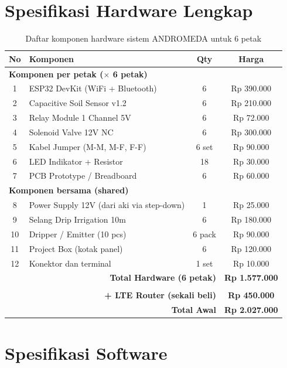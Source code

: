 \documentclass[12pt,a4paper,oneside]{report}
\begin{document}
\section{Spesifikasi Hardware Lengkap}

\begin{table}[H]
\centering
\caption{Daftar komponen hardware sistem ANDROMEDA untuk 6 petak}
\label{tab:hardware}
\begin{tabularx}{\textwidth}{c X c c}
\toprule
\textbf{No} & \textbf{Komponen} & \textbf{Qty} & \textbf{Harga} \\
\midrule
\multicolumn{4}{l}{\textbf{Komponen per petak ($\times$ 6 petak)}} \\
1 & ESP32 DevKit (WiFi + Bluetooth) & 6 & Rp 390.000 \\
2 & Capacitive Soil Sensor v1.2 & 6 & Rp 210.000 \\
3 & Relay Module 1 Channel 5V & 6 & Rp 72.000 \\
4 & Solenoid Valve 12V NC & 6 & Rp 300.000 \\
5 & Kabel Jumper (M-M, M-F, F-F) & 6 set & Rp 90.000 \\
6 & LED Indikator + Resistor & 18 & Rp 30.000 \\
7 & PCB Prototype / Breadboard & 6 & Rp 60.000 \\
\midrule
\multicolumn{4}{l}{\textbf{Komponen bersama (shared)}} \\
8 & Power Supply 12V (dari aki via step-down) & 1 & Rp 25.000 \\
9 & Selang Drip Irrigation 10m & 6 & Rp 180.000 \\
10 & Dripper / Emitter (10 pcs) & 6 pack & Rp 90.000 \\
11 & Project Box (kotak panel) & 6 & Rp 120.000 \\
12 & Konektor dan terminal & 1 set & Rp 10.000 \\
\midrule
\multicolumn{3}{r}{\textbf{Total Hardware (6 petak)}} & \textbf{Rp 1.577.000} \\
\multicolumn{3}{r}{} & \\
\multicolumn{3}{r}{\textbf{+ LTE Router (sekali beli)}} & \textbf{Rp 450.000} \\
\multicolumn{3}{r}{\textbf{Total Awal}} & \textbf{Rp 2.027.000} \\
\bottomrule
\end{tabularx}
\end{table}

\section{Spesifikasi Software}
\end{document}
